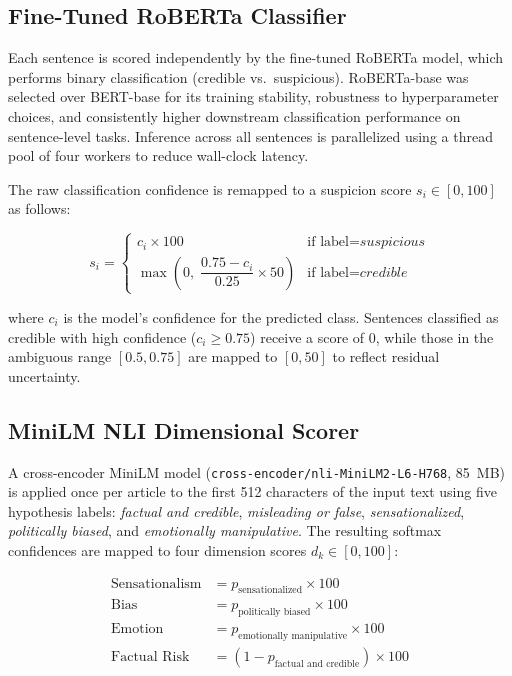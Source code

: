 \documentclass[journal]{IEEEtran}
\begin{document}
\subsection{Fine-Tuned RoBERTa Classifier}

Each sentence is scored independently by the fine-tuned RoBERTa model, which performs
binary classification (credible vs.\ suspicious). RoBERTa-base was selected over BERT-base
for its training stability, robustness to hyperparameter choices, and consistently higher
downstream classification performance on sentence-level tasks. Inference across all
sentences is parallelized using a thread pool of four workers to reduce wall-clock latency.

The raw classification confidence is remapped to a suspicion score $s_i \in [0, 100]$ as
follows:

\begin{equation}
s_i =
\begin{cases}
c_i \times 100 & \text{if label} = \textit{suspicious} \\
\max\!\left(0,\; \dfrac{0.75 - c_i}{0.25} \times 50\right) & \text{if label} = \textit{credible}
\end{cases}
\label{eq:remap}
\end{equation}

where $c_i$ is the model's confidence for the predicted class. Sentences classified as
credible with high confidence ($c_i \geq 0.75$) receive a score of 0, while those in the
ambiguous range $[0.5, 0.75]$ are mapped to $[0, 50]$ to reflect residual uncertainty.

\subsection{MiniLM NLI Dimensional Scorer}

A cross-encoder MiniLM model (\texttt{cross-encoder/nli-MiniLM2-L6-H768}, 85~MB) is
applied once per article to the first 512 characters of the input text using five
hypothesis labels: \textit{factual and credible}, \textit{misleading or false},
\textit{sensationalized}, \textit{politically biased}, and \textit{emotionally manipulative}.
The resulting softmax confidences are mapped to four dimension scores $d_k \in [0, 100]$:

\begin{align}
\text{Sensationalism} &= p_\text{sensationalized} \times 100 \\
\text{Bias}           &= p_\text{politically biased} \times 100 \\
\text{Emotion}        &= p_\text{emotionally manipulative} \times 100 \\
\text{Factual Risk}   &= (1 - p_\text{factual and credible}) \times 100
\end{align}
\end{document}
